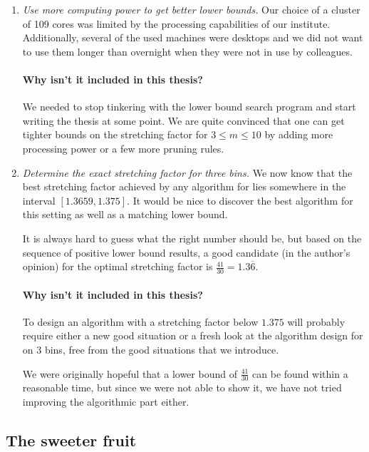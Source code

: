 \begin{enumerate}

\item \textit{Use more computing power to get better lower bounds.}
Our choice of a cluster of 109 cores was limited by the processing
capabilities of our institute. Additionally, several of the used
machines were desktops and we did not want to use them longer than
overnight when they were not in use by colleagues.

\paragraph{Why isn't it included in this thesis?} We needed to stop
tinkering with the lower bound search program and start writing the
thesis at some point. We are quite convinced that one can get tighter
bounds on the stretching factor for $3 \le m \le 10$ by adding more
processing power or a few more pruning rules.

\item \textit{Determine the exact stretching factor for three bins.}
We now know that the best stretching factor achieved by any algorithm
for \binstretch lies somewhere in the interval $[1.3659,1.375]$. It
would be nice to discover the best algorithm for this setting as well
as a matching lower bound.

It is always hard to guess what the right number should be, but based
on the sequence of positive lower bound results, a good candidate (in
the author's opinion) for the optimal stretching factor is
$\frac{41}{30} = 1.3\overline{6}$.

\paragraph{Why isn't it included in this thesis?} To design an
algorithm with a stretching factor below $1.375$ will probably require
either a new good situation or a fresh look at the algorithm design
for \binstretch on $3$ bins, free from the good situations that we
introduce.

We were originally hopeful that a lower bound of $\frac{41}{30}$ can
be found within a reasonable time, but since we were not able to show
it, we have not tried improving the algorithmic part either.
\end{enumerate}

\subsection{The sweeter fruit}

